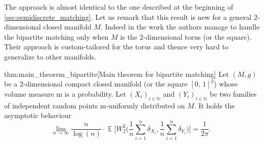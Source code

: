 \documentclass[JEP,XML,SOM,Unicode]{cedram}
\theoremstyle{plain}
\theoremstyle{definition}
\numberwithin{equation}{section}
\newcommand{\NN}{\ensuremath{\mathbb N}}
\newcommand{\bbE}[1]{\ensuremath{\operatorname{\mathbb{E}}\biggl[#1\biggr]}}
\newcommand{\cc}[2]{\ensuremath{\left[#1,\,#2\right]}}
\newcommand{\fullstop}{\ensuremath{\text{. }}}
\newcommand{\m}{\ensuremath{\mathrm m}}
\newcommand{\metric}{\ensuremath{g}}
\begin{document}
The approach is almost identical to the one described at the beginning of \cref{sec:semidiscrete_matching}.
Let us remark that this result is new for a general $2$-dimensional closed manifold $M$.
Indeed in the work \cite{Ambrosio-Stra-Trevisan2018} the authors manage to handle the bipartite
matching only when $M$ is the $2$-dimensional torus (or the square).
Their approach is custom-tailored for the torus and thence very hard to generalize to other manifolds.

\begin{reptheorem}{thm:main_theorem_bipartite}[Main theorem for bipartite matching]
Let $(M,\metric)$ be a $2$\nobreakdash-dimensional compact closed manifold (or the square $\cc01^2$) whose volume
measure $\m$ is a probability.
Let $(X_i)_{i\in\NN}$ and $(Y_i)_{i\in\NN}$ be two families of independent random points
$\m$-uniformly distributed on $M$.
It holds the asymptotic behaviour
\begin{equation*}
\lim_{n\to\infty} \frac{n}{\log(n)}\cdot
\bbE{W^2_2\biggl(\frac1n\sum_{i=1}^n\delta_{X_i}, \frac1n\sum_{i=1}^n\delta_{Y _i}\biggr)}
=\frac1{2\pi} \fullstop
\end{equation*}
\end{reptheorem}
\end{document}
